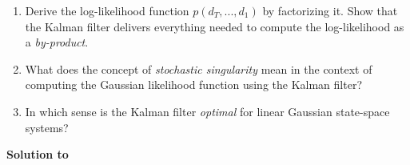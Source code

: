 \begin{enumerate}
	\item Derive the log-likelihood function $p(d_T,...,d_1)$ by factorizing it. Show that the Kalman filter delivers everything needed to compute the log-likelihood as a \emph{by-product}.
	\item What does the concept of \emph{stochastic singularity} mean in the context of computing the Gaussian likelihood function using the Kalman filter?
	\item In which sense is the Kalman filter \emph{optimal} for linear Gaussian state-space systems?
\end{enumerate}

\begin{solution}\textbf{Solution to }
\ifDisplaySolutions

\fi
\newpage
\end{solution}